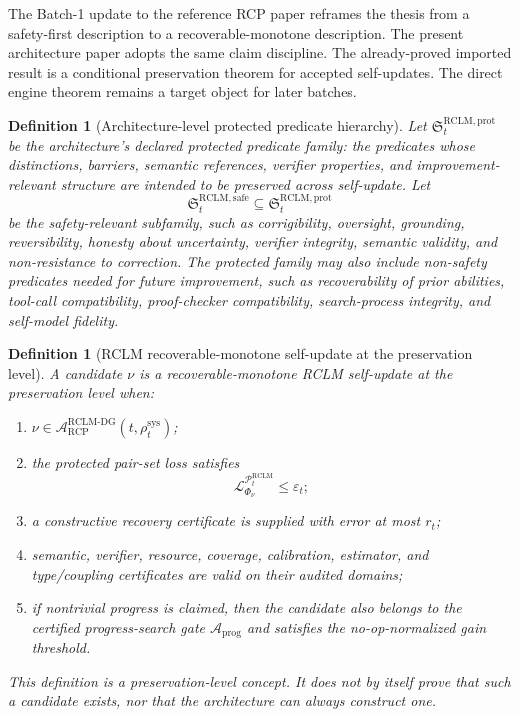\documentclass[11pt,a4paper]{article}
\newtheorem{definition}[theorem]{Definition}
\newcommand{\Lcal}{\mathcal L}
\newcommand{\Pcal}{\mathcal P}
\newcommand{\Acal}{\mathcal A}
\newcommand{\eps}{\varepsilon}
\newcommand{\RCP}{\mathrm{RCP}}
\newcommand{\RCLM}{\mathrm{RCLM}}
\newcommand{\DG}{\mathrm{DG}}
\newcommand{\sys}{\mathrm{sys}}
\newcommand{\safe}{\mathrm{safe}}
\newcommand{\prot}{\mathrm{prot}}
\begin{document}
The Batch-1 update to the reference RCP paper reframes the thesis from a safety-first description to a recoverable-monotone description.  The present architecture paper adopts the same claim discipline.  The already-proved imported result is a conditional preservation theorem for accepted self-updates.  The direct engine theorem remains a target object for later batches.

\begin{definition}[Architecture-level protected predicate hierarchy]
\label{def:rclm-protected-predicate-hierarchy}
Let \(\mathfrak S_t^{\RCLM,\prot}\) be the architecture's declared protected predicate family: the predicates whose distinctions, barriers, semantic references, verifier properties, and improvement-relevant structure are intended to be preserved across self-update.  Let
\[
\mathfrak S_t^{\RCLM,\safe}\subseteq\mathfrak S_t^{\RCLM,\prot}
\]
be the safety-relevant subfamily, such as corrigibility, oversight, grounding, reversibility, honesty about uncertainty, verifier integrity, semantic validity, and non-resistance to correction.  The protected family may also include non-safety predicates needed for future improvement, such as recoverability of prior abilities, tool-call compatibility, proof-checker compatibility, search-process integrity, and self-model fidelity.
\end{definition}

\begin{definition}[RCLM recoverable-monotone self-update at the preservation level]
\label{def:rclm-recoverable-monotone-preservation}
A candidate \(\nu\) is a recoverable-monotone RCLM self-update at the preservation level when:
\begin{enumerate}[label=(\roman*),leftmargin=1.5em]
    \item \(\nu\in\Acal_{\RCP}^{\RCLM\text{-}\DG}(t,\rho_t^{\sys})\);
    \item the protected pair-set loss satisfies
    \[
    \Lcal^{\Pcal_t^{\RCLM}}_{\Phi_\nu}\le\eps_t;
    \]
    \item a constructive recovery certificate is supplied with error at most \(r_t\);
    \item semantic, verifier, resource, coverage, calibration, estimator, and type/coupling certificates are valid on their audited domains;
    \item if nontrivial progress is claimed, then the candidate also belongs to the certified progress-search gate \(\Acal_{\mathrm{prog}}\) and satisfies the no-op-normalized gain threshold.
\end{enumerate}
This definition is a preservation-level concept.  It does not by itself prove that such a candidate exists, nor that the architecture can always construct one.
\end{definition}
\end{document}

